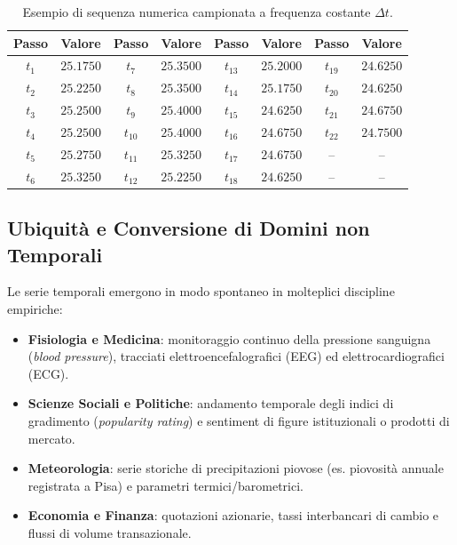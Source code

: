 \begin{table}[H]
\centering
\small
\renewcommand{\arraystretch}{1.2}
\begin{tabular}{c c c c c c c c}
\toprule
\textbf{Passo} & \textbf{Valore} & \textbf{Passo} & \textbf{Valore} & \textbf{Passo} & \textbf{Valore} & \textbf{Passo} & \textbf{Valore} \\
\midrule
$t_1$  & $25.1750$ & $t_7$  & $25.3500$ & $t_{13}$ & $25.2000$ & $t_{19}$ & $24.6250$ \\
$t_2$  & $25.2250$ & $t_8$  & $25.3500$ & $t_{14}$ & $25.1750$ & $t_{20}$ & $24.6250$ \\
$t_3$  & $25.2500$ & $t_9$  & $25.4000$ & $t_{15}$ & $24.6250$ & $t_{21}$ & $24.6750$ \\
$t_4$  & $25.2500$ & $t_{10}$ & $25.4000$ & $t_{16}$ & $24.6750$ & $t_{22}$ & $24.7500$ \\
$t_5$  & $25.2750$ & $t_{11}$ & $25.3250$ & $t_{17}$ & $24.6750$ & -- & -- \\
$t_6$  & $25.3250$ & $t_{12}$ & $25.2250$ & $t_{18}$ & $24.6250$ & -- & -- \\
\bottomrule
\end{tabular}
\caption{Esempio di sequenza numerica campionata a frequenza costante $\Delta t$.}
\label{tab:ts-sample-stream}
\end{table}

\FloatBarrier
\subsection{Ubiquit\`a e Conversione di Domini non Temporali}
\label{subsec:ts-ubiquity-conversion}

Le serie temporali emergono in modo spontaneo in molteplici discipline empiriche:
\begin{itemize}
    \item \textbf{Fisiologia e Medicina}: monitoraggio continuo della pressione sanguigna (\textit{blood pressure}), tracciati elettroencefalografici (EEG) ed elettrocardiografici (ECG).
    \item \textbf{Scienze Sociali e Politiche}: andamento temporale degli indici di gradimento (\textit{popularity rating}) e sentiment di figure istituzionali o prodotti di mercato.
    \item \textbf{Meteorologia}: serie storiche di precipitazioni piovose (es. piovosit\`a annuale registrata a Pisa) e parametri termici/barometrici.
    \item \textbf{Economia e Finanza}: quotazioni azionarie, tassi interbancari di cambio e flussi di volume transazionale.
\end{itemize}

